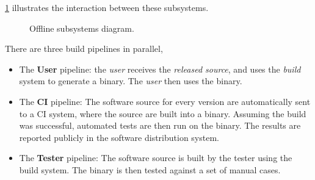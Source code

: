 \cref{fig:offline-diagram} illustrates the interaction between these subsystems.

\begin{figure}
  
  \caption{\label{fig:offline-diagram} Offline subsystems diagram.}
\end{figure}


There are three build pipelines in parallel,
\begin{itemize}
\item The \textbf{User} pipeline: the \emph{user} receives the \emph{released
    source}, and uses the \emph{build} system to generate a binary. The
    \emph{user} then uses the binary.
  \item The \textbf{\gls{CI}} pipeline: The software source for every version
    are automatically sent to a \gls{CI} system, where the source are built into
    a binary. Assuming the build was successful, automated tests are then run
    on the binary. The results are reported publicly in the software
    distribution system.
  \item The \textbf{Tester} pipeline: The software source is built by the tester
    using the build system. The binary is then tested against a set of manual
    cases.
\end{itemize}